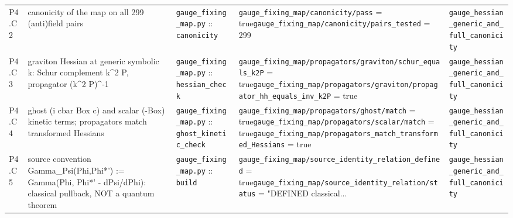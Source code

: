 {\begin{longtable}{@{}p{0.9cm}p{4.1cm}p{3.5cm}p{5.0cm}p{3.0cm}@{}}
P4.C2 & canonicity of the map on all 299 (anti)field pairs & \texttt{gauge\_\allowbreak{}fixing\_\allowbreak{}map.\allowbreak{}py} :: \texttt{canonicity} & \texttt{gauge\_\allowbreak{}fixing\_\allowbreak{}map/\allowbreak{}canonicity/\allowbreak{}pass} = true\newline \texttt{gauge\_\allowbreak{}fixing\_\allowbreak{}map/\allowbreak{}canonicity/\allowbreak{}pairs\_\allowbreak{}tested} = 299 & \texttt{gauge\_\allowbreak{}hessian\_\allowbreak{}generic\_\allowbreak{}and\_\allowbreak{}full\_\allowbreak{}canonicity} \\
P4.C3 & graviton Hessian at generic symbolic k: Schur complement k\^{}2 P, propagator (k\^{}2 P)\^{}-1 & \texttt{gauge\_\allowbreak{}fixing\_\allowbreak{}map.\allowbreak{}py} :: \texttt{hessian\_\allowbreak{}check} & \texttt{gauge\_\allowbreak{}fixing\_\allowbreak{}map/\allowbreak{}propagators/\allowbreak{}graviton/\allowbreak{}schur\_\allowbreak{}equals\_\allowbreak{}k2P} = true\newline \texttt{gauge\_\allowbreak{}fixing\_\allowbreak{}map/\allowbreak{}propagators/\allowbreak{}graviton/\allowbreak{}propagator\_\allowbreak{}hh\_\allowbreak{}equals\_\allowbreak{}inv\_\allowbreak{}k2P} = true & \texttt{gauge\_\allowbreak{}hessian\_\allowbreak{}generic\_\allowbreak{}and\_\allowbreak{}full\_\allowbreak{}canonicity} \\
P4.C4 & ghost (i cbar Box c) and scalar (-Box) kinetic terms; propagators match transformed Hessians & \texttt{gauge\_\allowbreak{}fixing\_\allowbreak{}map.\allowbreak{}py} :: \texttt{ghost\_\allowbreak{}kinetic\_\allowbreak{}check} & \texttt{gauge\_\allowbreak{}fixing\_\allowbreak{}map/\allowbreak{}propagators/\allowbreak{}ghost/\allowbreak{}match} = true\newline \texttt{gauge\_\allowbreak{}fixing\_\allowbreak{}map/\allowbreak{}propagators/\allowbreak{}scalar/\allowbreak{}match} = true\newline \texttt{gauge\_\allowbreak{}fixing\_\allowbreak{}map/\allowbreak{}propagators\_\allowbreak{}match\_\allowbreak{}transformed\_\allowbreak{}Hessians} = true & \texttt{gauge\_\allowbreak{}hessian\_\allowbreak{}generic\_\allowbreak{}and\_\allowbreak{}full\_\allowbreak{}canonicity} \\
P4.C5 & source convention Gamma\_Psi(Phi,Phi*') := Gamma(Phi, Phi*' - dPsi/dPhi): classical pullback, NOT a quantum theorem & \texttt{gauge\_\allowbreak{}fixing\_\allowbreak{}map.\allowbreak{}py} :: \texttt{build} & \texttt{gauge\_\allowbreak{}fixing\_\allowbreak{}map/\allowbreak{}source\_\allowbreak{}identity\_\allowbreak{}relation\_\allowbreak{}defined} = true\newline \texttt{gauge\_\allowbreak{}fixing\_\allowbreak{}map/\allowbreak{}source\_\allowbreak{}identity\_\allowbreak{}relation/\allowbreak{}status} = "DEFINED classical.\allowbreak{}.\allowbreak{}.\allowbreak{} & \texttt{gauge\_\allowbreak{}hessian\_\allowbreak{}generic\_\allowbreak{}and\_\allowbreak{}full\_\allowbreak{}canonicity} \\

\end{longtable}}
